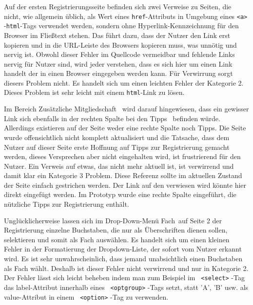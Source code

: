{ Auf der ersten Registrierungsseite befinden sich zwei Verweise zu Seiten, die nicht, wie allgemein üblich, als Wert eines \texttt{href}-Attributs in Umgebung eines \texttt{\textless a\textgreater} -\texttt{html}-Tags verwendet werden, sondern ohne Hyperlink-Kennzeichnung für den Browser im Fließtext stehen. Das führt dazu, dass der Nutzer den Link erst kopieren und in die URL-Leiste des Browsers kopieren muss, was unnötig und nervig ist.
}
{ Obwohl dieser Fehler im Quellcode vermeidbar und fehlende Links nervig für Nutzer sind, wird jeder verstehen, dass es sich hier um einen Link handelt der in einen Browser eingegeben werden kann. Für Verwirrung sorgt diesers Problem nicht. Es handelt sich um einen leichten Fehler der Kategorie 2.
}
{ Dieses Problem ist sehr leicht mit einem \texttt{html}-Link zu lösen.
} 

{ Im Bereich \glqq Zusätzliche Mitgliedschaft\grqq ~ wird darauf hingewiesen, dass ein gewisser Link sich ebenfalls in der \glqq rechten Spalte bei den Tipps\grqq ~ befinden würde. Allerdings existieren auf der Seite weder eine rechte Spalte noch Tipps. Die Seite wurde offensichtlich nicht komplett aktualisiert und die Tatsache, dass dem Nutzer auf dieser Seite erste Hoffnung auf Tipps zur Registrierung gemacht werden, dieses Versprechen aber nicht eingehalten wird, ist frustrierend für den Nutzer.
}
{ Ein Verweis auf etwas, das nicht mehr aktuell ist, ist verwirrend und damit klar ein Kategorie 3 Problem.
}
{ Diese Referenz sollte im aktuellen Zustand der Seite einfach gestrichen werden. Der Link auf den verwiesen wird könnte hier direkt eingefügt werden. Im Prototyp wurde eine rechte Spalte eingeführt, die nützliche Tipps zur Registrierung enthält.
} 

{ Unglücklicherweise lassen sich im Drop-Down-Menü \glqq Fach\grqq ~auf Seite 2 der Registrierung einzelne Buchstaben, die nur als Überschriften dienen sollen, selektieren und somit als Fach auswählen. 
}
{ Es handelt sich um einen kleinen Fehler in der Formatierung der Dropdown-Liste, der sofort vom Nutzer erkannt wird. Es ist sehr unwahrscheinlich, dass jemand unabsichtlich einen Buchstaben als Fach wählt. Deshalb ist dieser Fehler nicht verwirrend und nur in Kategorie 2.
}
{ Der Fehler lässt sich leicht beheben indem man zum Beispiel im \texttt{ \textless select\textgreater} -Tag das label-Attribut innerhalb eines \texttt{ \textless optgroup\textgreater  } -Tags setzt, statt 'A', 'B' usw. als value-Attribut in einem \texttt{ \textless option\textgreater} -Tag zu verwenden.
} 



